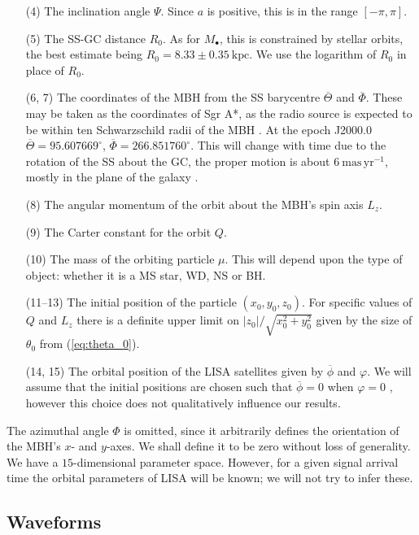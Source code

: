 \documentclass[useAMS,usedcolumn,usegraphicx,usenatbib]{mn2e}
\newcommand{\eqnref}[1]{(\ref{eq:#1})}
\newcommand{\units}[1]{\ensuremath{~\mathrm{#1}}}
\begin{document}
\begin{enumerate}
\item[(4)] The inclination angle $\Psi$. Since $a$ is positive, this is in the range $[-\pi, \pi]$.
\item[(5)] The SS-GC distance $R_0$. As for $M_\bullet$, this is constrained by stellar orbits, the best estimate being \citep{Gillessen2009} $R_0 = 8.33 \pm 0.35\units{kpc}$. We use the logarithm of $R_0$ in place of $R_0$.
\item[(6, 7)] The coordinates of the MBH from the SS barycentre $\overline{\Theta}$ and $\overline{\Phi}$. These may be taken as the coordinates of Sgr A*, as the radio source is expected to be within ten Schwarzschild radii of the MBH \citep{Reid2003,Doeleman2008}. At the epoch J2000.0 \citep{Reid1999} $\overline{\Theta} = {95.607669}^{\circ}$, $\overline{\Phi} = {266.851760}^{\circ}$. This will change with time due to the rotation of the SS about the GC, the proper motion is about $6\units{mas\,yr^{-1}}$, mostly in the plane of the galaxy \citep{Reid1999, Backer1999, Reid2003}.
\item[(8)] The angular momentum of the orbit about the MBH's spin axis $L_z$.
\item[(9)] The Carter constant for the orbit $Q$.
\item[(10)] The mass of the orbiting particle $\mu$. This will depend upon the type of object: whether it is a MS star, WD, NS or BH.
\item[(11--13)] The initial position of the particle $(x_0, y_0, z_0)$. For specific values of $Q$ and $L_z$ there is a definite upper limit on $|z_0|/\sqrt{x_0^2+y_0^2}$ given by the size of $\theta_0$ from \eqnref{theta_0}.
\item[(14, 15)] The orbital position of the LISA satellites given by $\overline{\phi}$ and $\varphi$. We will assume that the initial positions are chosen such that $\overline{\phi} = 0$ when $\varphi = 0$ \citep{Cutler1998}, however this choice does not qualitatively influence our results.\\
\end{enumerate}%
The azimuthal angle $\Phi$ is omitted, since it arbitrarily defines the orientation of the MBH's $x$- and $y$-axes. We shall define it to be zero without loss of generality. We have a $15$-dimensional parameter space. However, for a given signal arrival time the orbital parameters of LISA will be known; we will not try to infer these.

\subsection{Waveforms}
\end{document}
